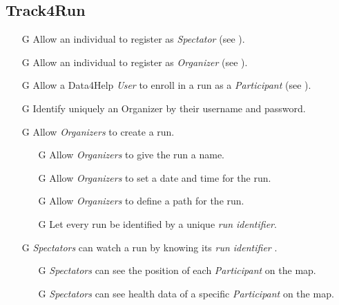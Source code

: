 \documentclass[../../rasd.tex]{subfiles}
\begin{document}
				\subsection{Track4Run}
					\begin{itemize}
						\item[G\subs{15}]Allow an individual to register as \textit{Spectator} (see ).
						\item[G\subs{16}]Allow an individual to register as \textit{Organizer} (see ).
						\item[G\subs{17}]Allow a Data4Help \textit{User} to enroll in a run as a \textit{Participant} (see ).
						\item[G\subs{18}]Identify uniquely an Organizer by their username and password.
						
						\item[G\subs{19}]Allow \textit{Organizers} to create a run.
						\begin{itemize}
							\item[G\subs{19.1}]Allow \textit{Organizers} to give the run a name.
							\item[G\subs{19.2}]Allow \textit{Organizers} to set a date and time for the run.
							\item[G\subs{19.3}]Allow \textit{Organizers} to define a path for the run.
							\item[G\subs{19.4}]Let every run be identified by a unique \textit{run identifier}.
						\end{itemize}

						\item[G\subs{20}]\textit{Spectators} can watch a run by knowing its \textit{run identifier} .
							\begin{itemize}
							\item[G\subs{20.1}]\textit{Spectators} can see the position of each \textit{Participant} on the map.
							\item[G\subs{20.2}]\textit{Spectators} can see health data of a specific \textit{Participant} on the map.
							\end{itemize}
					\end{itemize}
			
			
\end{document}
